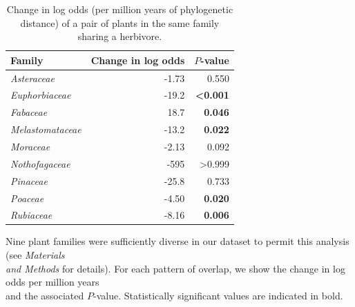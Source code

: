 \documentclass[12pt]{article}
\begin{document}
  \begin{table}[!h]
  \caption{\small Change in log odds (per million years of phylogenetic distance) of a pair of plants in the same family sharing a herbivore.}
  \label{family_slopes_ph}
  \begin{tabular}{|l  rr|}
  \hline
    Family & Change in log odds & $P$-value \\
    \hline
    \emph{Asteraceae} & -1.73 &  0.550 \\
    \emph{Euphorbiaceae} & -19.2 & \textbf{\textless0.001} \\
    \emph{Fabaceae} & 18.7 &  \textbf{0.046} \\
    \emph{Melastomataceae} & -13.2 & \textbf{0.022} \\
    \emph{Moraceae} & -2.13 & 0.092 \\
    \emph{Nothofagaceae} & -595 & \textgreater{0.999} \\
    \emph{Pinaceae} &  -25.8 & 0.733 \\
    \emph{Poaceae} & -4.50 & \textbf{0.020} \\
    \emph{Rubiaceae} & -8.16 &  \textbf{0.006} \\
  \hline
  \end{tabular}
  \smallskip
  \footnotesize

  Nine plant families were sufficiently diverse in our  dataset to permit this analysis
  (see \emph{Materials \\and Methods} for details). For each pattern of overlap, we show the change
  in log odds per million years \\and the associated $P$-value. Statistically significant values are
  indicated in bold. \\

  \end{table}
\end{document}
